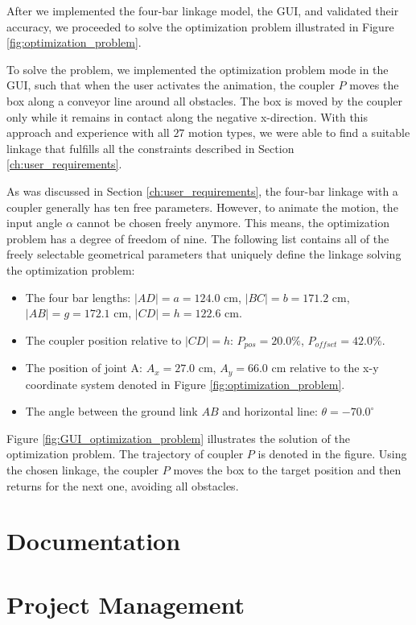 \documentclass{article}
\begin{document}
After we implemented the four-bar linkage model, the GUI, and validated their accuracy, we proceeded to solve the optimization problem illustrated in Figure \ref{fig:optimization_problem}.

To solve the problem, we implemented the optimization problem mode in the GUI, such that when the user activates the animation, the coupler $P$ moves the box along a conveyor line around all obstacles. The box is moved by the coupler only while it remains in contact along the negative x-direction. With this approach and experience with all $27$ motion types, we were able to find a suitable linkage that fulfills all the constraints described in Section \ref{ch:user_requirements}.

As was discussed in Section \ref{ch:user_requirements}, the four-bar linkage with a coupler generally has ten free parameters. However, to animate the motion, the input angle $\alpha$ cannot be chosen freely anymore. This means, the optimization problem has a degree of freedom of nine. The following list contains all of the freely selectable geometrical parameters that uniquely define the linkage solving the optimization problem:
\begin{itemize}
	\item The four bar lengths: $|AD| = a = 124.0$ cm, $|BC| = b = 171.2$ cm, $|AB| = g = 172.1$ cm, $|CD| = h = 122.6$ cm.
	\item The coupler position relative to $|CD| = h$: $P_{pos} = 20.0 \%$, $P_{offset} = 42.0 \%$.
	\item The position of joint A: $A_x = 27.0$ cm, $A_y = 66.0$ cm relative to the x-y coordinate system denoted in Figure \ref{fig:optimization_problem}.
	\item The angle between the ground link $AB$ and horizontal line: $\theta = -70.0^{\circ}$
\end{itemize}

Figure \ref{fig:GUI_optimization_problem} illustrates the solution of the optimization problem. The trajectory of coupler $P$ is denoted in the figure. Using the chosen linkage, the coupler $P$ moves the box to the target position and then returns for the next one, avoiding all obstacles.

\section{Documentation}\label{ch:doc}

\section{Project Management} \label{ch:projectmanagement}
\end{document}
